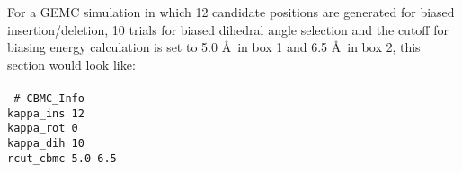 %
For a GEMC simulation in which 12 candidate positions are generated for biased insertion/deletion, 10 trials for
biased dihedral angle selection and the cutoff for biasing energy calculation is set to 5.0 \AA\ in box 1 and 6.5 \AA\
in box 2, this section would look like: \\ \\
%
\texttt{
\# CBMC\_Info \\
kappa\_ins   12 \\
kappa\_rot     0 \\
kappa\_dih   10 \\
rcut\_cbmc   5.0 6.5}
%
%
%
